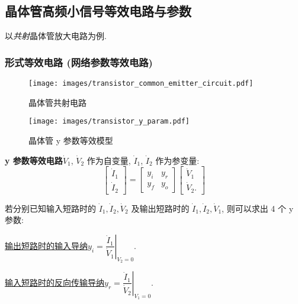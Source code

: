 \subsection{晶体管高频小信号等效电路与参数} \label{3 晶体管高频小信号等效电路与参数}

以\textit{共射}晶体管放大电路为例.

\subsubsection{形式等效电路 (网络参数等效电路)}

\begin{figure}[H]
    \centering
    \begin{minipage}{.288\textwidth}
        \centering
        \texttt{[image: images/transistor\_common\_emitter\_circuit.pdf]}
        \caption{晶体管共射电路}
    \end{minipage}
    \begin{minipage}{.512\textwidth}
        \centering
        \texttt{[image: images/transistor\_y\_param.pdf]}
        \caption{晶体管 y 参数等效模型}
        \label{fig:3.2 transistor y param}
    \end{minipage}
\end{figure}

\textbf{y 参数等效电路}\quad $\dot{V}_1$, $\dot{V}_2$ 作为自变量, $\dot{I}_1$, $\dot{I}_2$ 作为参变量:
\begin{equation} \label{eq:3.2 y param}
    \begin{bmatrix}
        \dot{I}_1 \\
        \dot{I}_2
    \end{bmatrix}=
    \begin{bmatrix}
        y_i & y_r \\
        y_f & y_o
    \end{bmatrix}
    \begin{bmatrix}
        \dot{V}_1 \\
        \dot{V}_2.
    \end{bmatrix}
\end{equation}

若分别已知输入短路时的 $\dot{I}_1, \dot{I}_2, \dot{V}_2$ 及输出短路时的 $\dot{I}_1, \dot{I}_2, \dot{V}_1$, 则可以求出 4 个 y 参数:

\underline{输出短路时的输入导纳}\quad $y_i=\left.\dfrac{\dot{I}_1}{\dot{V}_1}\right|_{V_2=0}$.

\underline{输入短路时的反向传输导纳}\quad $y_r=\left.\dfrac{\dot{I}_1}{\dot{V}_2}\right|_{V_1=0}$.

